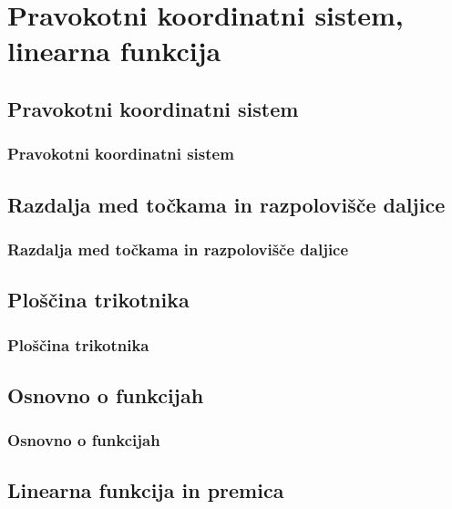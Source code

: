 \section{Pravokotni koordinatni sistem, linearna funkcija}

\begin{frame}
    \sectionpage
\end{frame}

\begin{frame}
\end{frame}

    \subsection{Pravokotni koordinatni sistem}

        \begin{frame}
            \frametitle{Pravokotni koordinatni sistem}
        \end{frame}

    \subsection{Razdalja med točkama in razpolovišče daljice}

        \begin{frame}
            \frametitle{Razdalja med točkama in razpolovišče daljice}
        \end{frame}

    \subsection{Ploščina trikotnika}

        \begin{frame}
            \frametitle{Ploščina trikotnika}
        \end{frame}

    \subsection{Osnovno o funkcijah}

        \begin{frame}
            \frametitle{Osnovno o funkcijah}
        \end{frame}

    \subsection{Linearna funkcija in premica}

